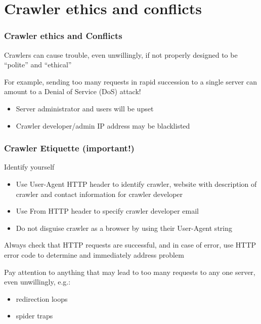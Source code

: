 \documentclass{beamer}
\begin{document}














\section{Crawler ethics and conflicts}


\begin{frame} \frametitle{Crawler ethics and Conflicts}


Crawlers can cause trouble, even unwillingly, if not properly designed to be ``polite'' and ``ethical''

For example, sending too many requests in rapid succession to a single server can amount to a Denial of Service (DoS) attack!
\begin{itemize}
\item Server administrator and users will be upset
\item Crawler developer/admin IP address may be blacklisted
\end{itemize}
\end{frame}


\begin{frame} \frametitle{Crawler Etiquette (important!)}

Identify yourself
\begin{itemize}
\item Use User-Agent HTTP header to identify crawler, website with description of crawler and contact information for crawler developer
\item Use From HTTP header to specify crawler developer email
\item Do not disguise crawler as a browser by using their User-Agent string
\end{itemize}

Always check that HTTP requests are successful, and in case of error, use HTTP error code to determine and immediately address problem

Pay attention to anything that may lead to too many requests to any one server, even unwillingly, e.g.:
\begin{itemize}
\item redirection loops
\item spider traps
\end{itemize}

\end{frame}
\end{document}
